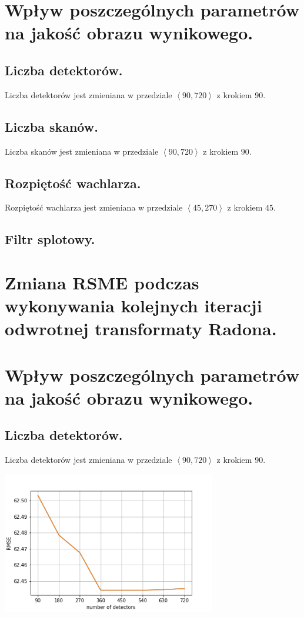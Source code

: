 \documentclass[a4paper, 11pt]{article}
\begin{document}
\section{Wpływ poszczególnych parametrów na jakość obrazu wynikowego.}
\subsection{Liczba detektorów.}

Liczba detektorów jest zmieniana w przedziale $\left<90, 720 \right>$ z krokiem $90$.
\subsection{Liczba skanów.}

Liczba skanów jest zmieniana w przedziale $\left<90, 720 \right>$ z krokiem $90$.
\subsection{Rozpiętość wachlarza.}

Rozpiętość wachlarza jest zmieniana w przedziale $\left<45, 270 \right>$ z krokiem $45$.
\subsection{Filtr splotowy.}

\section{Zmiana RSME podczas wykonywania kolejnych iteracji odwrotnej transformaty Radona.}

\section{Wpływ poszczególnych parametrów na jakość obrazu wynikowego.}
\subsection{Liczba detektorów.}

Liczba detektorów jest zmieniana w przedziale $\left<90, 720 \right>$ z krokiem $90$.

\begin{center}
	\includegraphics[width=0.7\textwidth]{detectors.png}
\end{center}
\end{document}

